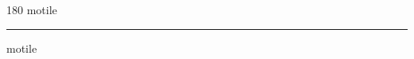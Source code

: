 
\begin{frame}
\begin{center}
\begin{turn}{180}
{\fontsize{2.5cm}{1em}\selectfont motile}
\end{turn}
\vspace{1em}\par  
\hrule
\vspace{1em}\par  
{\fontsize{2.5cm}{1em}\selectfont motile}
\end{center}
\end{frame}
